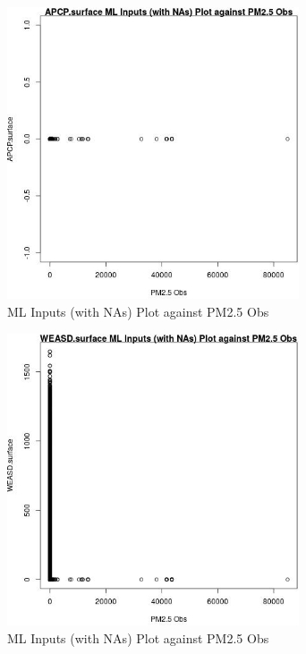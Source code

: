 \begin{figure} 
\centering  
\includegraphics[width=0.77\textwidth]{Code_Outputs/Report_ML_input_PM25_Step4_part_f_de_duplicated_aveswNAs_APCPsurfacevPM25_Obs.jpg} 
\caption{\label{fig:Report_ML_input_PM25_Step4_part_f_de_duplicated_aveswNAsAPCPsurfacevPM25_Obs}ML Inputs (with NAs) Plot against PM2.5 Obs} 
\end{figure} 
 

\clearpage 

\begin{figure} 
\centering  
\includegraphics[width=0.77\textwidth]{Code_Outputs/Report_ML_input_PM25_Step4_part_f_de_duplicated_aveswNAs_WEASDsurfacevPM25_Obs.jpg} 
\caption{\label{fig:Report_ML_input_PM25_Step4_part_f_de_duplicated_aveswNAsWEASDsurfacevPM25_Obs}ML Inputs (with NAs) Plot against PM2.5 Obs} 
\end{figure} 
 

